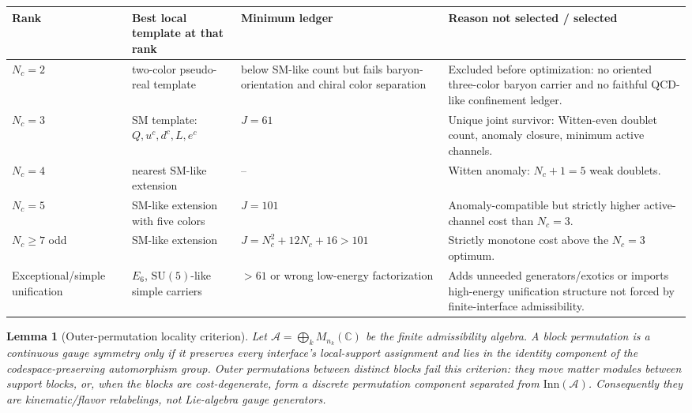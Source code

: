 \documentclass[11pt]{article}
\newtheorem{lemma}[theorem]{Lemma}
\theoremstyle{definition}
\newcommand{\SU}{\mathrm{SU}}
\begin{document}
\begin{center}
\scriptsize
\renewcommand{\arraystretch}{1.1}
\begin{tabular}{@{}p{2.6cm}p{3.0cm}p{3.0cm}p{4.2cm}@{}}
\toprule
\textbf{Rank} & \textbf{Best local template at that rank} & \textbf{Minimum ledger} & \textbf{Reason not selected / selected} \\
\midrule
$N_c=2$ & two-color pseudo-real template & below SM-like count but fails baryon-orientation and chiral color separation & Excluded before optimization: no oriented three-color baryon carrier and no faithful QCD-like confinement ledger. \\
$N_c=3$ & SM template: $Q,u^c,d^c,L,e^c$ & $J=61$ & Unique joint survivor: Witten-even doublet count, anomaly closure, minimum active channels. \\
$N_c=4$ & nearest SM-like extension & -- & Witten anomaly: $N_c+1=5$ weak doublets. \\
$N_c=5$ & SM-like extension with five colors & $J=101$ & Anomaly-compatible but strictly higher active-channel cost than $N_c=3$. \\
$N_c\ge7$ odd & SM-like extension & $J=N_c^2+12N_c+16>101$ & Strictly monotone cost above the $N_c=3$ optimum. \\
Exceptional/simple unification & $E_6$, $\SU(5)$-like simple carriers & $>61$ or wrong low-energy factorization & Adds unneeded generators/exotics or imports high-energy unification structure not forced by finite-interface admissibility. \\
\bottomrule
\end{tabular}
\label{tab:joint_Nc_template_optimum}
\end{center}

\begin{lemma}[Outer-permutation locality criterion]
\label{lem:outer_kinematic}
Let $\mathcal A=\bigoplus_k M_{n_k}(\mathbb C)$ be the finite admissibility
algebra.  A block permutation is a continuous gauge symmetry only if it
preserves every interface's local-support assignment and lies in the identity
component of the codespace-preserving automorphism group.  Outer permutations
between distinct blocks fail this criterion: they move matter modules between
support blocks, or, when the blocks are cost-degenerate, form a discrete
permutation component separated from $\mathrm{Inn}(\mathcal A)$.
Consequently they are kinematic/flavor relabelings, not Lie-algebra gauge
generators.
\end{lemma}
\end{document}
